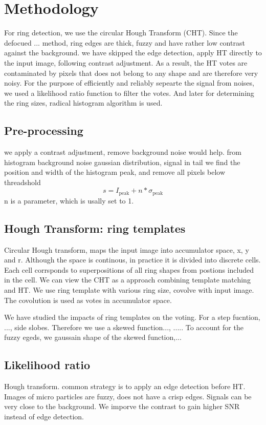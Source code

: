 \section{Methodology} 

For ring detection, we use the circular Hough Transform (CHT).  Since the
defocued ... method, ring edges are thick, fuzzy and have rather low contrast
against the background.  we have skipped the edge detection, apply HT directly
to the input image, following contrast adjustment.  As a result, the HT votes
are contaminated by pixels that does not belong to any shape and are therefore
very noisy. For the purpose of efficiently and reliably sepearte the signal
from noises, we used a likelihood ratio function to filter the votes.  And
later for determining the ring sizes, radical histogram algorithm is used.

\subsection{Pre-processing}
we apply a contrast adjustment, remove background noise would help.
from histogram background noise gaussian distribution, signal in tail
we find the position and width of the histogram peak, and remove all pixels below threadshold
$$s = I_{\mathrm{peak}} + n *\sigma_\mathrm{peak}$$
n is a parameter, which is usally set to 1.

\subsection{Hough Transform: ring templates} 

Circular Hough transform, maps the input image into accumulator space, x, y and
r.  Although the space is continous, in practice it is divided into discrete
cells.  Each cell corrsponds to superpositions of all ring shapes from postions
included in the cell.  We can view the CHT as a approach combining template
matching and HT. We use ring template with various ring size, covolve with
input image. The covolution is used as votes in accumulator space.

We have studied the impacts of ring templates on the voting. For a step fucntion,
..., side slobes. Therefore we use a skewed function..., ..... To account for the
fuzzy egeds, we gaussain shape of the skewed function,...

\subsection{Likelihood ratio}
Hough transform.
common strategy is to apply an edge detection before HT.
Images of micro particles are fuzzy, does not have a crisp edges. 
Signals can be very close to the background.
We imporve the contrast to gain higher SNR instead of edge detection.

